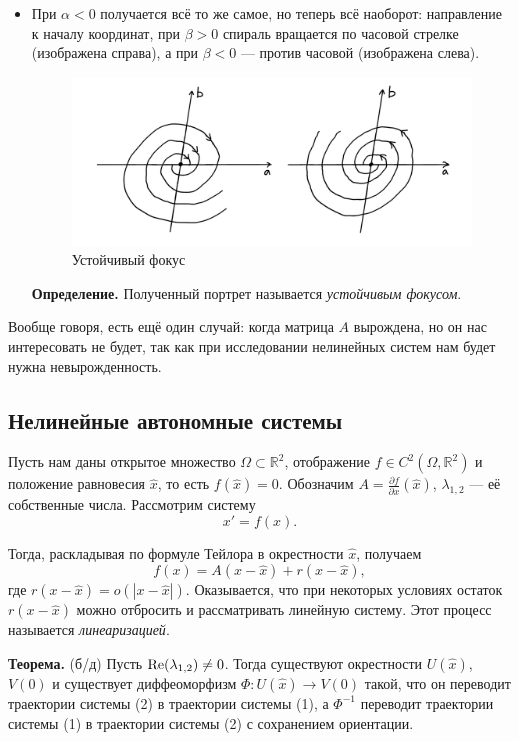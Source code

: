 \begin{itemize}
\item При $\alpha < 0$ получается всё то же самое, но теперь всё наоборот: направление к началу координат, при $\beta > 0$ спираль вращается по часовой стрелке (изображена справа), а при $\beta < 0$ --- против часовой (изображена слева).
\pagebreak
\begin{figure}[h]
    \includegraphics[scale=0.25]{stable-focus}
    \centering
    \caption{Устойчивый фокус}
\end{figure}

\textbf{Определение.} Полученный портрет называется \textit{устойчивым фокусом}.
\end{itemize}

Вообще говоря, есть ещё один случай: когда матрица $A$ вырождена, но он нас интересовать не будет, так как при исследовании нелинейных систем нам будет нужна невырожденность.

\subsection{Нелинейные автономные системы}
Пусть нам даны открытое множество $\Omega \subset \mathbb R^2$, отображение $f \in C^2(\Omega, \mathbb R^2)$ и положение равновесия $\widehat{x}$, то есть $f(\widehat{x}) = 0$. Обозначим $A = \frac{\partial f}{\partial x}(\widehat{x})$, $\lambda_{1, 2}$ --- её собственные числа.
Рассмотрим систему
\begin{equation}
    x' = f(x).
\end{equation}

Тогда, раскладывая по формуле Тейлора в окрестности $\widehat{x}$, получаем
\[
    f(x) = A(x - \widehat{x}) + r(x - \widehat{x}),
\]
где $r(x - \widehat{x}) = o(|x-\widehat{x}|)$. Оказывается, что при некоторых условиях остаток $r(x - \widehat{x})$ можно отбросить и рассматривать линейную систему. Этот процесс называется \textit{линеаризацией}.

\textbf{Теорема.} (б/д) Пусть $\operatorname{Re}(\lambda_{1, 2}) \ne 0$. Тогда существуют окрестности $U(\widehat{x})$, $V(0)$ и существует диффеоморфизм
$\Phi\colon U(\widehat{x}) \to V(0)$ такой, что он переводит траектории системы (2) в траектории системы (1), а $\Phi^{-1}$ переводит траектории системы (1) в траектории системы (2) с сохранением ориентации.

